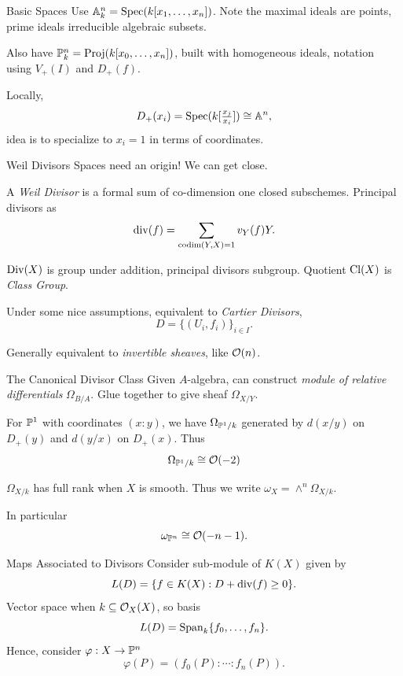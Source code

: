 \documentclass{beamer}
\begin{document}
\begin{frame}{Basic Spaces}
    Use $\mathbb{A}^n_k = {\rm Spec}(k[x_1, \ldots, x_n])$.
    Note the maximal ideals are points,
    prime ideals irreducible algebraic subsets.

    Also have $\mathbb{P}^n_k = {\rm Proj}(k[x_0, \ldots, x_n])$, built with homogeneous ideals,
    notation using $V_+(I)$ and $D_+(f)$.
    
    Locally,
    \[
        D_+(x_i) = {\rm Spec}(k[\tfrac{x_j}{x_i}]) \cong \mathbb{A}^n,
    \]
    idea is to specialize to $x_i = 1$ in terms of coordinates.
\end{frame}

\begin{frame}{Weil Divisors}
    Spaces need an origin! We can get close.
    
    A \textit{Weil Divisor} is a formal sum of co-dimension one closed subschemes.
    Principal divisors as
    \[
        {\rm div}(f) = \sum_{{\rm codim}(Y, X) = 1} v_Y(f) Y.
    \]

    ${\rm Div}(X)$ is group under addition, principal divisors subgroup. 
    Quotient ${\rm Cl}(X)$ is \textit{Class Group}.

    Under some nice assumptions, equivalent to \textit{Cartier Divisors},
    \[
        D = \{ (U_i, f_i) \}_{i \in I}.
    \]

    Generally equivalent to \textit{invertible sheaves}, like $\mathcal{O}(n)$.
\end{frame}

\begin{frame}{The Canonical Divisor Class}
    Given $A$-algebra, can construct \textit{module of relative differentials} $\Omega_{B/A}$.
    Glue together to give sheaf $\Omega_{X/Y}$.

    \begin{example}
    For $\mathbb{P}^1$ with coordinates $(x : y)$, we have $\Omega_{\mathbb{P}^1 / k}$ generated by $d(x/y)$ on $D_+(y)$ and $d(y/x)$ on $D_+(x)$.
    Thus
        \[
            \Omega_{\mathbb{P}^1 / k } \cong \mathcal{O}(-2)
        \]
    \end{example}

    $\Omega_{X/k}$ has full rank when $X$ is smooth. 
    Thus we write $\omega_X = \wedge^n \Omega_{X / k}$.
    
    In particular
    \[
        \omega_{\mathbb{P}^n} \cong \mathcal{O}(-n - 1).
    \]
\end{frame}

\begin{frame}{Maps Associated to Divisors}
    Consider sub-module of $K(X)$ given by
    \[
        L(D) = \{ f \in K(X) : D + {\rm div}(f) \geq 0 \}.
    \]
    Vector space when $k \subseteq \mathcal{O}_X(X)$, so basis
    \[
        L(D) = {\rm Span}_k \{ f_0, \ldots, f_n \}.
    \]
    Hence, consider $\varphi : X \to \mathbb{P}^n$
    \[
        \varphi(P) = (f_0(P) : \cdots : f_n(P)).
    \]
\end{frame}
\end{document}
